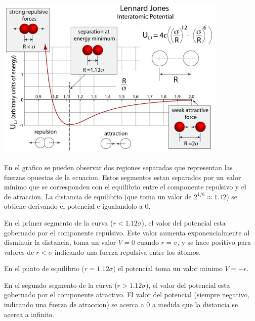 \documentclass[a4paper,10pt]{report}
\begin{document}
\vspace{14pt}
\begin{center}
\includegraphics[height=8cm,keepaspectratio, width=\textwidth]{img/LennardJonesFull.png}
\end{center}




En el grafico se pueden observar dos regiones separadas que representan las fuerzas opuestas de la ecuacion. 
Estos segmentos estan separados por un valor mínimo que se corresponden con el equilibrio entre el componente repulsivo y el de atraccion. 
La distancia de equilibrio (que toma un valor de $2^{1/6}\approx1.12$) se obtiene derivando el potencial e igualandolo a 0.

En el primer segmento de la curva ($r<1.12\sigma$), el valor del potencial esta gobernado por el componente repulsivo. 
Este valor aumenta exponencialmente al disminuir la distancia, toma un valor $V=0$ cuando $r=\sigma$, y se hace positivo para valores de $r<\sigma$ indicando una fuerza repulsiva entre los átomos.

En el punto de equilibrio ($r=1.12\sigma$) el potencial toma un valor minimo $V=-\epsilon$.

En el segundo segmento de la curva ($r>1.12\sigma$), el valor del potencial esta gobernado por el componente atractivo. El valor del potencial (siempre negativo, indicando una fuerza de atraccion) se acerca a 0 a medida que la distancia se acerca a infinito. 
\end{document}
